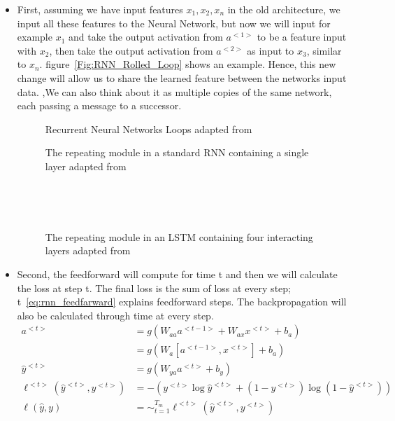 \begin{itemize}
\item First, assuming we have input features $x_1, x_2, x_n$ in the old architecture, we input all these features to the Neural Network, but now we will input for example $x_1$ and take the output activation from $a^{<1>}$ to be a feature input with $x_2$, then take the output activation from $a^{<2>}$ as input to $x_3$, similar to $x_n$. figure~\ref{Fig:RNN_Rolled_Loop} shows an example. Hence, this new change will allow us to share the learned feature between the networks input data. ,We can also think about it as multiple copies of the same network, each passing a message to a successor\cite{colah}.%

\begin{figure}[t]
\minipage{\textwidth}
\centering

\endminipage\hfill
\caption{Recurrent Neural Networks Loops adapted from~\cite{colah}}\label{Fig:RNN_Rolled_Loop}

\endminipage\hfill
{}

\endminipage\hfill
{}%

\endminipage
\caption{The repeating module in a standard RNN containing a single layer adapted from~\cite{colah}}~\label{Fig:LSTM_SimpleRNN}


\endminipage\hfill
{}

\endminipage\hfill
{}%

\endminipage
\caption{The repeating module in an LSTM containing four interacting layers adapted from~\cite{colah}}~\label{Fig:LSTM_Cell_Chaining}
\end{figure}%

\item Second, the feedforward will compute for time t and then we will calculate the loss at step t. The final loss is the sum of loss at every step; t~\eqref{eq:rnn_feedfarward} explains feedforward steps. The backpropagation will also be calculated through time at every step.%
\begin{subequations}\label{eq:rnn_feedfarward}
\begin{align}
 a^{<t>} & = g(W_{aa}a^{<t-1>}+ W_{ax}x^{<t>}+b_a)\\
  & = g(W_a[a^{<t-1>},x^{<t>}]+ b_a)\\
 \widehat{y}^{<t>} & = g(W_{ya}a^{<t>}+ b_y)
 \\ \ell^{<t>}(\widehat{y}^{<t>},y^{<t>}) & = - (y^{<t>} \log \widehat{y}^{<t>} + (1-y^{<t>}) \log (1-\widehat{y}^{<t>}))
\\ \ell(\widehat{y},y) & = \sim_{t=1}^{T_m} \ell^{<t>}(\widehat{y}^{<t>},y^{<t>})   
\end{align}
\end{subequations}%
 \end{itemize}


